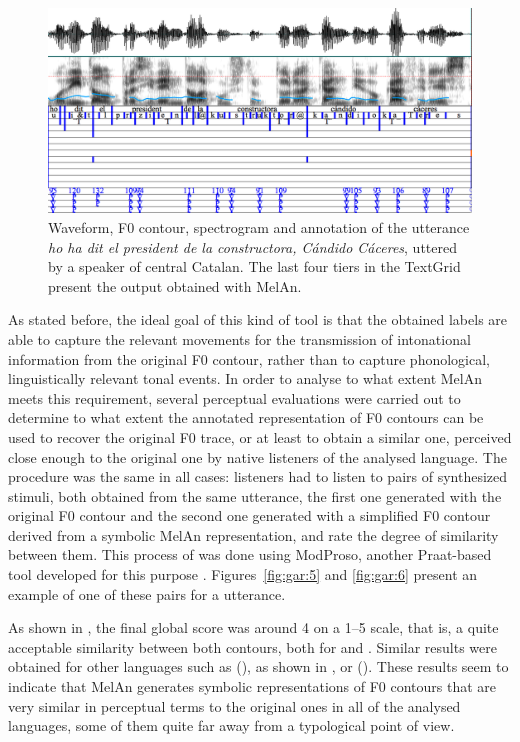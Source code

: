 \documentclass[output=paper]{langsci/langscibook}
\begin{document}
  
\begin{figure}
\includegraphics[width=\textwidth]{figures/GAR-img004.png}
\caption{Waveform, F0 contour, spectrogram and annotation of the utterance \textit{ho ha dit el president de la constructora, Cándido Cáceres}, uttered by a speaker of central Catalan. The last four tiers in the TextGrid present the output obtained with MelAn.}
\label{fig:gar:4}
\end{figure}
 

As stated before, the ideal goal of this kind of  tool is that the obtained labels are able to capture the relevant movements for the transmission of intonational information from the original F0 contour, rather than to capture phonological, linguistically relevant tonal events. In order to analyse to what extent MelAn meets this requirement, several perceptual evaluations were carried out to determine to what extent the annotated representation of F0 contours can be used to recover the original F0 trace, or at least to obtain a similar one, perceived close enough to the original one by native listeners of the analysed language. The procedure was the same in all cases: listeners had to listen to pairs of synthesized stimuli, both obtained from the same utterance, the first one generated with the original F0 contour and the second one generated with a simplified F0 contour derived from a symbolic MelAn representation, and rate the degree of similarity between them. This process of  was done using ModProso, another Praat-based tool developed for this purpose \citep{Garrido2013ModProso}. Figures~\ref{fig:gar:5} and \ref{fig:gar:6} present an example of one of these pairs for a  utterance. 

 

As shown in , the final global score was around 4 on a 1--5 scale, that is, a quite acceptable similarity between both contours, both for  and . Similar results were obtained for other languages such as   (\citealt{Yao2010}), as shown in , or  (\citealt{ConceicaoSilva.2016}). These results seem to indicate that MelAn generates symbolic representations of F0 contours that are very similar in perceptual terms to the original ones in all of the analysed languages, some of them quite far away from a typological point of view. 
\end{document}
